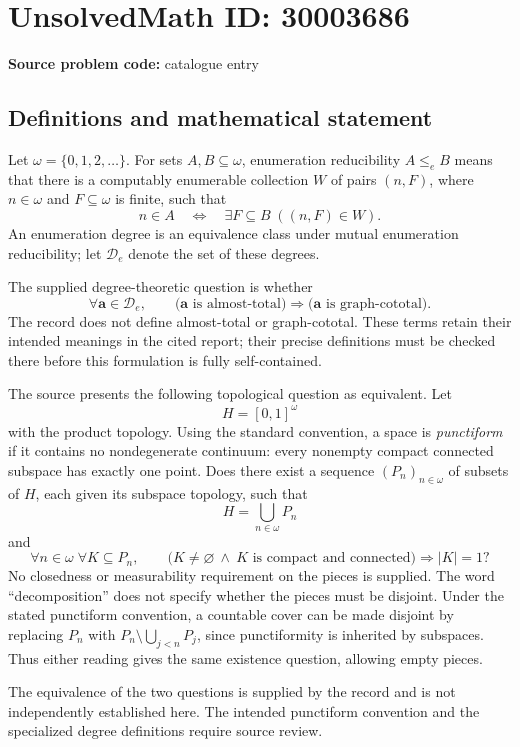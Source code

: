 \documentclass[11pt]{article}
\begin{document}
\section*{UnsolvedMath ID: 30003686}
\textbf{Source problem code:} catalogue entry
\subsection{Definitions and mathematical statement}
Let \(\omega=\{0,1,2,\ldots\}\). For sets \(A,B\subseteq\omega\), enumeration reducibility \(A\leq_e B\) means that there is a computably enumerable collection \(W\) of pairs \((n,F)\), where \(n\in\omega\) and \(F\subseteq\omega\) is finite, such that
\[
 n\in A\quad\Longleftrightarrow\quad \exists F\subseteq B\;((n,F)\in W).
\]
An enumeration degree is an equivalence class under mutual enumeration reducibility; let \(\mathcal D_e\) denote the set of these degrees.

The supplied degree-theoretic question is whether
\[
 \forall \mathbf a\in\mathcal D_e,\qquad
 \bigl(\mathbf a\text{ is almost-total}\bigr)
 \Longrightarrow
 \bigl(\mathbf a\text{ is graph-cototal}\bigr).
\]
The record does not define almost-total or graph-cototal. These terms retain their intended meanings in the cited report; their precise definitions must be checked there before this formulation is fully self-contained.

The source presents the following topological question as equivalent. Let
\[
 H=[0,1]^\omega
\]
with the product topology. Using the standard convention, a space is \emph{punctiform} if it contains no nondegenerate continuum: every nonempty compact connected subspace has exactly one point. Does there exist a sequence \((P_n)_{n\in\omega}\) of subsets of \(H\), each given its subspace topology, such that
\[
 H=\bigcup_{n\in\omega}P_n
\]
and
\[
 \forall n\in\omega\;\forall K\subseteq P_n,\qquad
 \bigl(K\ne\varnothing\ \land\ K\text{ is compact and connected}\bigr)
 \Longrightarrow |K|=1?
\]
No closedness or measurability requirement on the pieces is supplied. The word ``decomposition'' does not specify whether the pieces must be disjoint. Under the stated punctiform convention, a countable cover can be made disjoint by replacing \(P_n\) with \(P_n\setminus\bigcup_{j<n}P_j\), since punctiformity is inherited by subspaces. Thus either reading gives the same existence question, allowing empty pieces.

The equivalence of the two questions is supplied by the record and is not independently established here. The intended punctiform convention and the specialized degree definitions require source review.
\end{document}
